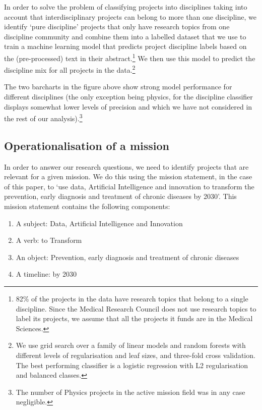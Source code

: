 \documentclass[11pt]{article}
\begin{document}
In order to solve the problem of classifying projects into disciplines taking into account that interdisciplinary projects can belong to more than one discipline, we identify `pure discipline’ projects that only have research topics from one discipline community and combine them into a labelled dataset that we use to train a machine learning model that predicts project discipline labels based on the (pre-processed) text in their abstract.\footnote{82\% of the projects in the data have research topics that belong to a single discipline. Since the Medical Research Council does not use research topics to label its projects, we assume that all the projects it funds are in the Medical Sciences.} We then use this model
to predict the discipline mix for all projects in the data.\footnote{We use grid search over a family of linear models and random forests with different levels
of regularisation and leaf sizes, and three-fold cross validation. The best performing classifier is a logistic regression with L2 regularisation and balanced classes.} 

The two barcharts in the figure above show strong model performance for different
disciplines (the only exception being physics, for the discipline classifier displays somewhat lower levels of precision and which we have not considered in the rest of our analysis).\footnote{The number of Physics projects in the active mission field was in any case negligible.}

\subsection{Operationalisation of a mission}
In order to answer our research questions, we need to identify projects that are relevant for a given mission. We do this using the mission statement, in the case of this paper, to `use
data, Artificial Intelligence and innovation to transform the prevention, early
diagnosis and treatment of chronic diseases by 2030'. This mission statement
contains the following components:

\begin{enumerate}
    \item A subject: Data, Artificial Intelligence and Innovation
    \item A verb: to Transform
    \item An object: Prevention, early diagnosis and treatment of chronic diseases
    \item A timeline: by 2030
\end{enumerate}
\end{document}

